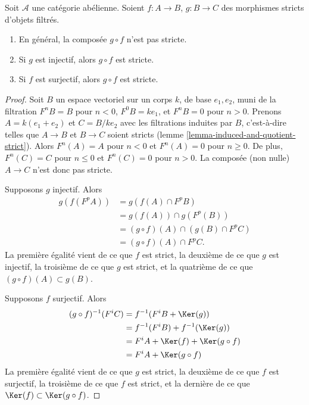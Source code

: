 \begin{lemma}
\label{lemma-composition-strict}
Soit $\mathcal{A}$ une catégorie abélienne. Soient $f : A \to B$, $g : B \to C$
des morphismes stricts d'objets filtrés.
\begin{enumerate}
\item En général, la composée $g \circ f$ n'est pas stricte.
\item Si $g$ est injectif, alors $g \circ f$ est stricte.
\item Si $f$ est surjectif, alors $g \circ f$ est stricte.
\end{enumerate}
\end{lemma}

\begin{proof}
Soit $B$ un espace vectoriel sur un corps $k$, de base $e_1, e_2$, muni de la
filtration $F^nB = B$ pour $n < 0$, $F^0B = ke_1$, et $F^nB = 0$ pour
$n > 0$. Prenons $A = k(e_1 + e_2)$ et $C = B/ke_2$ avec les filtrations
induites par $B$, c'est-à-dire telles que $A \to B$ et $B \to C$ soient stricts
(lemme \ref{lemma-induced-and-quotient-strict}).
Alors $F^n(A) = A$ pour $n < 0$ et $F^n(A) = 0$ pour $n \geq 0$. 
De plus, $F^n(C) = C$ pour $n \leq 0$ et $F^n(C) = 0$ pour $n > 0$.
La composée (non nulle) $A \to C$ n'est donc pas stricte.

\medskip\noindent
Supposons $g$ injectif. Alors
\begin{align*}
g(f(F^pA)) & = g(f(A) \cap F^pB) \\
& = g(f(A)) \cap g(F^p(B)) \\
& = (g \circ f)(A) \cap (g(B) \cap F^pC) \\
& = (g \circ f)(A) \cap F^pC.
\end{align*}
La première égalité vient de ce que $f$ est strict, la deuxième de ce que $g$ est injectif,
la troisième de ce que $g$ est strict, et la quatrième de ce que
$(g \circ f)(A) \subset g(B)$.

\medskip\noindent
Supposons $f$ surjectif. Alors
\begin{align*}
(g \circ f)^{-1}(F^iC) & = f^{-1}(F^iB + \Ker(g)) \\
& = f^{-1}(F^iB) + f^{-1}(\Ker(g)) \\
& = F^iA + \Ker(f) + \Ker(g \circ f) \\
& = F^iA + \Ker(g \circ f)
\end{align*}
La première égalité vient de ce que $g$ est strict, la deuxième de ce que $f$ est
surjectif, la troisième de ce que $f$ est strict, et la dernière de ce que
$\Ker(f) \subset \Ker(g \circ f)$.
\end{proof}

